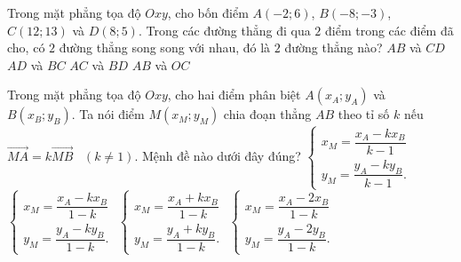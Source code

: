 \begin{ex}%
	Trong mặt phẳng tọa độ $Oxy$, cho bốn điểm $A(-2;6)$, $B(-8;-3)$, $C(12;13)$ và $D(8;5)$. Trong các đường thẳng đi qua $2$ điểm trong các điểm đã cho, có $2$ đường thẳng song song với nhau, đó là $2$ đường thẳng nào?
	\choice
	{$AB$ và $CD$}
	{$AD$ và $BC$}
	{\True $AC$ và $BD$}
	{$AB$ và $OC$}
\end{ex}

\begin{ex}%
	\def\dotEX{}
	Trong mặt phẳng tọa độ $Oxy$, cho hai điểm phân biệt $A(x_A;y_A)$ và $B(x_B;y_B).$ Ta nói điểm $M(x_M;y_M)$ chia đoạn thẳng $AB$ theo tỉ số $k$ nếu $\vec{MA}=k\vec{MB}$ \ $(k\ne1)$. Mệnh đề nào dưới đây đúng?
	\choice
	{$\begin{cases}x_M=\dfrac{x_A-kx_B}{k-1} \\
		y_M=\dfrac{y_A-ky_B}{k-1}.
		\end{cases}$}
	{\True 
		$\begin{cases}x_M=\dfrac{x_A-kx_B}{1-k} \\
		y_M=\dfrac{y_A-ky_B}{1-k}.
		\end{cases}$}
	{$\begin{cases}x_M=\dfrac{x_A+kx_B}{1-k} \\
		y_M=\dfrac{y_A+ky_B}{1-k}.
		\end{cases}$}
	{$\begin{cases}x_M=\dfrac{x_A-2x_B}{1-k} \\
		y_M=\dfrac{y_A-2y_B}{1-k}.
		\end{cases}$}
\end{ex}



